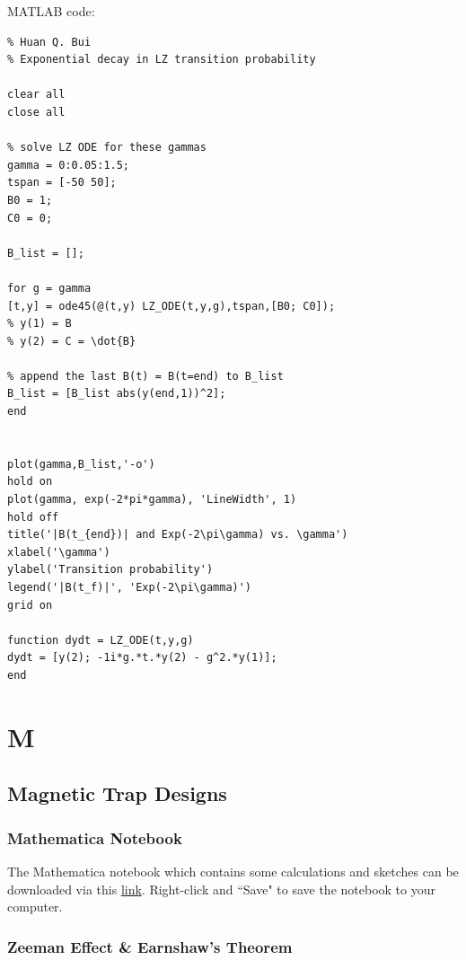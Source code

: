 \documentclass{book}
\theoremstyle{definition}
\begin{document}
MATLAB code:
\begin{lstlisting}
% Huan Q. Bui
% Exponential decay in LZ transition probability

clear all
close all

% solve LZ ODE for these gammas
gamma = 0:0.05:1.5;
tspan = [-50 50];
B0 = 1;
C0 = 0;

B_list = [];

for g = gamma
[t,y] = ode45(@(t,y) LZ_ODE(t,y,g),tspan,[B0; C0]);
% y(1) = B
% y(2) = C = \dot{B}

% append the last B(t) = B(t=end) to B_list
B_list = [B_list abs(y(end,1))^2];
end


plot(gamma,B_list,'-o')
hold on
plot(gamma, exp(-2*pi*gamma), 'LineWidth', 1)
hold off
title('|B(t_{end})| and Exp(-2\pi\gamma) vs. \gamma')
xlabel('\gamma')
ylabel('Transition probability')
legend('|B(t_f)|', 'Exp(-2\pi\gamma)')
grid on

function dydt = LZ_ODE(t,y,g)
dydt = [y(2); -1i*g.*t.*y(2) - g^2.*y(1)];
end

\end{lstlisting}


\chapter*{M}



\section*{Magnetic Trap Designs}





\subsection*{Mathematica Notebook}
The Mathematica notebook which contains some calculations and sketches can be downloaded via this \href{https://raw.githubusercontent.com/huanium/huanium/master/MIT PhD/BUI_AtomicPhysics/mathematica/magnetic-traps.nb}{link}. Right-click and ``Save" to save the notebook to your computer. 


\subsection*{Zeeman Effect \& Earnshaw's Theorem}
\end{document}
